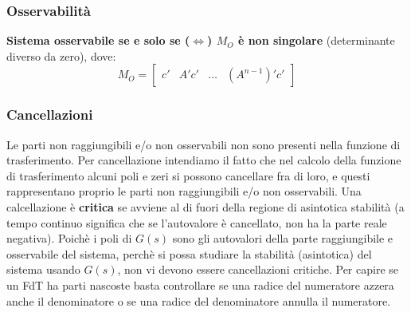 \begin{landscape}
\begin{multicols*}{3}
    \subsubsection*{Osservabilità}
    \textbf{Sistema osservabile se e solo se ($\Leftrightarrow$) $M_O$ è non singolare} (determinante diverso da zero), dove:
    \[
        M_O = \left[\begin{matrix}
            c' & A'c' & \dots & (A^{n-1})' c'
        \end{matrix}\right]
    \]
    \subsubsection*{Cancellazioni}
    Le parti non raggiungibili e/o non osservabili non sono presenti nella funzione di trasferimento.\newline
    Per cancellazione intendiamo il fatto che nel calcolo della funzione di trasferimento alcuni poli
    e zeri si possono cancellare fra di loro, e questi rappresentano proprio le parti non raggiungibili
    e/o non osservabili.\newline
    \newline
    Una calcellazione è \textbf{critica} se avviene al di fuori della regione di asintotica stabilità (a tempo continuo significa che se l'autovalore è cancellato, non ha la parte reale negativa).\newline
    Poichè i poli di $G(s)$ sono gli autovalori della parte raggiungibile e osservabile del sistema, perchè si possa studiare la stabilità (asintotica) del sistema usando $G(s)$, non vi devono essere cancellazioni critiche.
    \newline
    \newline
    Per capire se un FdT ha parti nascoste basta controllare se una radice del numeratore azzera anche il denominatore o se una radice del denominatore annulla il numeratore. 

\end{multicols*}
\end{landscape}
